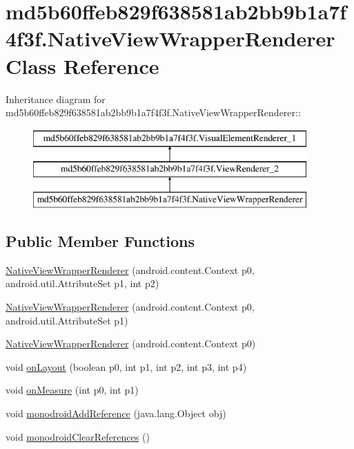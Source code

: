 \hypertarget{classmd5b60ffeb829f638581ab2bb9b1a7f4f3f_1_1_native_view_wrapper_renderer}{
\section{md5b60ffeb829f638581ab2bb9b1a7f4f3f.NativeViewWrapperRenderer Class Reference}
\label{classmd5b60ffeb829f638581ab2bb9b1a7f4f3f_1_1_native_view_wrapper_renderer}
}
Inheritance diagram for md5b60ffeb829f638581ab2bb9b1a7f4f3f.NativeViewWrapperRenderer::\begin{figure}[H]
\begin{center}
\leavevmode
\includegraphics[height=3cm]{classmd5b60ffeb829f638581ab2bb9b1a7f4f3f_1_1_native_view_wrapper_renderer}
\end{center}
\end{figure}
\subsection*{Public Member Functions}
\begin{CompactItemize}
\item 
\hyperlink{classmd5b60ffeb829f638581ab2bb9b1a7f4f3f_1_1_native_view_wrapper_renderer_6b9d648e0b1da0d659615ff7f77d7448}{NativeViewWrapperRenderer} (android.content.Context p0, android.util.AttributeSet p1, int p2)
\item 
\hyperlink{classmd5b60ffeb829f638581ab2bb9b1a7f4f3f_1_1_native_view_wrapper_renderer_7420e67b434dbf414eb77a0095b2e091}{NativeViewWrapperRenderer} (android.content.Context p0, android.util.AttributeSet p1)
\item 
\hyperlink{classmd5b60ffeb829f638581ab2bb9b1a7f4f3f_1_1_native_view_wrapper_renderer_e139b1499b806b364389719fdac62705}{NativeViewWrapperRenderer} (android.content.Context p0)
\item 
void \hyperlink{classmd5b60ffeb829f638581ab2bb9b1a7f4f3f_1_1_native_view_wrapper_renderer_428463947529e7fd1d164b52f9d54d56}{onLayout} (boolean p0, int p1, int p2, int p3, int p4)
\item 
void \hyperlink{classmd5b60ffeb829f638581ab2bb9b1a7f4f3f_1_1_native_view_wrapper_renderer_83a4564a9f543507b77196fd2c440f12}{onMeasure} (int p0, int p1)
\item 
void \hyperlink{classmd5b60ffeb829f638581ab2bb9b1a7f4f3f_1_1_native_view_wrapper_renderer_c0772b6e92a3ac384e0afcad6f2b8f3a}{monodroidAddReference} (java.lang.Object obj)
\item 
void \hyperlink{classmd5b60ffeb829f638581ab2bb9b1a7f4f3f_1_1_native_view_wrapper_renderer_114bc48169194b48313389e210786635}{monodroidClearReferences} ()
\end{CompactItemize}
